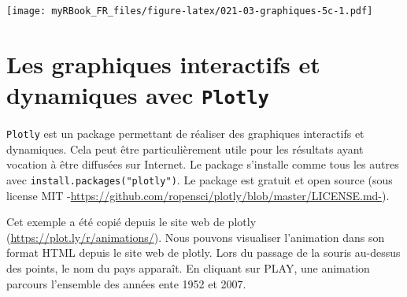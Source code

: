 \documentclass[twoside,symmetric]{book}
\newenvironment{Shaded}{}{}
\newcommand{\DataTypeTok}[1]{\underline{#1}}
\newcommand{\DecValTok}[1]{#1}
\newcommand{\KeywordTok}[1]{\textbf{#1}}
\newcommand{\NormalTok}[1]{#1}
\newcommand{\OperatorTok}[1]{#1}
\newcommand{\StringTok}[1]{#1}
\begin{document}
\begin{Shaded}
\end{Shaded}

\texttt{[image: myRBook\_FR\_files/figure-latex/021-03-graphiques-5c-1.pdf]}

\hypertarget{les-graphiques-interactifs-et-dynamiques-avec-plotly}{%
\section{\texorpdfstring{Les graphiques interactifs et dynamiques avec \texttt{Plotly}}{Les graphiques interactifs et dynamiques avec Plotly}}\label{les-graphiques-interactifs-et-dynamiques-avec-plotly}}

\texttt{Plotly} est un package permettant de réaliser des graphiques interactifs et dynamiques. Cela peut être particulièrement utile pour les résultats ayant vocation à être diffusées sur Internet. Le package s'installe comme tous les autres avec \texttt{install.packages("plotly")}. Le package est gratuit et open source (sous license MIT -\url{https://github.com/ropensci/plotly/blob/master/LICENSE.md-}).

Cet exemple a été copié depuis le site web de plotly (\url{https://plot.ly/r/animations/}). Nous pouvons visualiser l'animation dans son format HTML depuis le site web de plotly. Lors du passage de la souris au-dessus des points, le nom du pays apparaît. En cliquant sur PLAY, une animation parcours l'ensemble des années ente 1952 et 2007.
\end{document}
